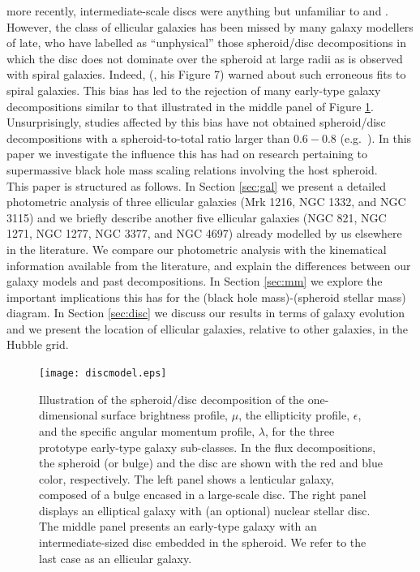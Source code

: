 \documentclass[useAMS,usenatbib,article]{mnras}
\begin{document}
more recently, intermediate-scale discs were anything but unfamiliar to \cite{kormendybender2012} and \cite{krajnovic2013etal}. 
However, the class of ellicular galaxies has been missed by many galaxy modellers of late, 
who have labelled as ``unphysical'' \citep{allen2006} those spheroid/disc decompositions in which the disc does not dominate over the spheroid at large radii 
as is observed with spiral galaxies. 
Indeed, \citeauthor{graham2011} (\citeyear{graham2011}, his Figure 7) warned about such erroneous fits to spiral galaxies. 
This bias has led to the rejection of many early-type galaxy decompositions similar to that illustrated in the middle panel of Figure \ref{fig:model}. 
Unsurprisingly, studies affected by this bias have not obtained spheroid/disc decompositions with a spheroid-to-total ratio larger than $0.6 - 0.8$ 
(e.g.~\citealt{gadotti2008,head2014,querejeta2015,mendezabreu2015}). 
In this paper we investigate the influence this has had on research pertaining to supermassive black hole mass scaling relations involving the host spheroid. \\
This paper is structured as follows. 
In Section \ref{sec:gal} we present a detailed photometric analysis of three ellicular galaxies (Mrk 1216, NGC 1332, and NGC 3115) 
and we briefly describe another five ellicular galaxies (NGC 821, NGC 1271, NGC 1277, NGC 3377, and NGC 4697) 
already modelled by us elsewhere in the literature. 
We compare our photometric analysis with the kinematical information available from the literature, 
and explain the differences between our galaxy models and past decompositions. 
In Section \ref{sec:mm} we explore the important implications this has for the (black hole mass)-(spheroid stellar mass) diagram. 
In Section \ref{sec:disc} we discuss our results in terms of galaxy evolution 
and we present the location of ellicular galaxies, relative to other galaxies, in the Hubble grid. 


\begin{figure}
\begin{center}
\texttt{[image: discmodel.eps]}
\caption{Illustration of the spheroid/disc decomposition of the one-dimensional surface brightness profile, $\mu$, 
the ellipticity profile, $\epsilon$, and the specific angular momentum profile, $\lambda$,
for the three prototype early-type galaxy sub-classes. 
In the flux decompositions, the spheroid (or bulge) and the disc are shown with the red and blue color, respectively. 
The left panel shows a lenticular galaxy, composed of a bulge encased in a large-scale disc. 
The right panel displays an elliptical galaxy with (an optional) nuclear stellar disc. 
The middle panel presents an early-type galaxy with an intermediate-sized disc embedded in the spheroid. 
We refer to the last case as an ellicular galaxy.}
\label{fig:model}
\end{center}
\end{figure}
\end{document}
